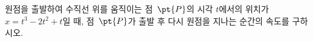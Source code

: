 원점을 출발하여 수직선 위를 움직이는 점~$\pt{P}$의 시각 $t$에서의 위치가 $x=t^3-2t^2+t$일 때, 점~$\pt{P}$가 출발 후 다시 원점을 지나는 순간의 속도를 구하시오.
